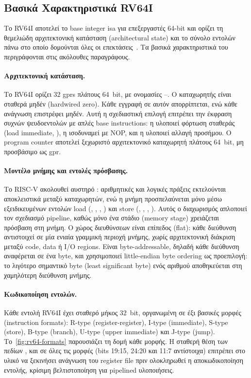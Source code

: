 \subsection{Βασικά Χαρακτηριστικά RV64I}
\label{ssec:rv64i-features}

Το RV64I αποτελεί το base integer \gls{isa} για επεξεργαστές 64-bit και ορίζει
τη θεμελιώδη αρχιτεκτονική κατάσταση (architectural state) και το σύνολο
εντολών πάνω στο οποίο δομούνται όλες οι επεκτάσεις~\cite{RISCV-unpriv2024}.
Τα βασικά χαρακτηριστικά του περιγράφονται στις ακόλουθες παραγράφους.

\paragraph{Αρχιτεκτονική κατάσταση.}
Το RV64I ορίζει \num{32} \glspl{gpr} πλάτους 64~bit, με ονομασίες
–. Ο καταχωρητής  είναι σταθερά μηδέν
(hardwired zero). Κάθε εγγραφή σε αυτόν απορρίπτεται, ενώ κάθε ανάγνωση
επιστρέφει μηδέν. Αυτή η σχεδιαστική επιλογή επιτρέπει την έκφραση συχνών ψευδοεντολών με
απλές base instructions: η  υλοποιεί φόρτωση σταθεράς
(load immediate, ), η  ισοδυναμεί με NOP, και η
 υλοποιεί αλλαγή προσήμου. Ο program counter
αποτελεί ξεχωριστό αρχιτεκτονικό καταχωρητή πλάτους 64~bit, μη
προσβάσιμο ως \gls{gpr}.

\paragraph{Μοντέλο μνήμης και εντολές πρόσβασης.}
Το RISC-V ακολουθεί αυστηρό : αριθμητικές και
λογικές πράξεις εκτελούνται αποκλειστικά μεταξύ καταχωρητών, ενώ η μνήμη
προσπελαύνεται μόνο μέσω εξειδικευμένων εντολών load (, ,
, ) και store (, , , ).
Αυτός ο διαχωρισμός απλοποιεί τον σχεδιασμό pipeline, καθώς μόνο ένα στάδιο
(memory stage) χρειάζεται πρόσβαση στη μνήμη. Ο χώρος διευθύνσεων είναι
επίπεδος (flat): κάθε διεύθυνση αντιστοιχεί σε μία ενιαία γραμμική περιοχή
μνήμης, χωρίς αρχιτεκτονική διάκριση μεταξύ code, data ή I/O regions. Είναι
byte-addressable, δηλαδή κάθε διεύθυνση αναφέρεται σε ένα byte, και
χρησιμοποιεί little-endian byte ordering ως προεπιλογή: το λιγότερο σημαντικό 
byte (least significant byte) ενός αριθμού αποθηκεύεται στη χαμηλότερη διεύθυνση μνήμης.


\paragraph{Κωδικοποίηση εντολών.}
Κάθε εντολή RV64I έχει σταθερό μήκος \num{32}~bit, οργανωμένη σε έξι
βασικές μορφές (instruction formats): R-type (register-register), I-type
(immediate), S-type (store), B-type (branch), U-type (upper immediate) και
J-type (jump). Το~\cref{fig:rv64-formats} παρουσιάζει τη δομή κάθε μορφής.
Η σταθερή θέση των πεδίων ,  και  σε όλες τις
μορφές (bits 19:15, 24:20 και 11:7 αντίστοιχα) επιτρέπει στο υλικό να
ξεκινήσει ανάγνωση του register file πριν ολοκληρωθεί η αποκωδικοποίηση
εντολής, κρίσιμη βελτιστοποίηση για pipelined υλοποιήσεις.

